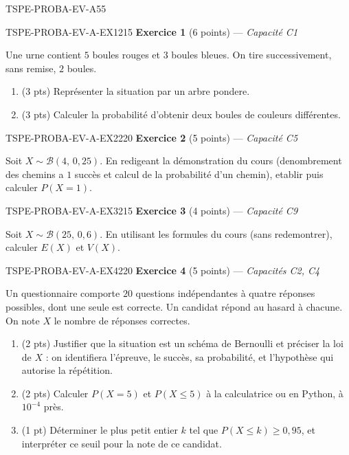 \begin{evaluation}{TSPE-PROBA-EV-A}{55}

\begin{exercice}{TSPE-PROBA-EV-A-EX1}{2}{15}
\textbf{Exercice 1} (6 points) — \textit{Capacité C1}

\medskip

Une urne contient $5$ boules rouges et $3$ boules bleues. On tire successivement, sans remise, $2$ boules.
\begin{enumerate}
  \item (3 pts) Représenter la situation par un arbre pondere.
  \item (3 pts) Calculer la probabilité d'obtenir deux boules de couleurs différentes.
\end{enumerate}
\end{exercice}

\begin{exercice}{TSPE-PROBA-EV-A-EX2}{2}{20}
\textbf{Exercice 2} (5 points) — \textit{Capacité C5}

\medskip

Soit $X \sim \mathcal{B}(4,\,0{,}25)$. En redigeant la démonstration du cours (denombrement des chemins a $1$ succès et calcul de la probabilité d'un chemin), etablir puis calculer $P(X=1)$.
\end{exercice}

\begin{exercice}{TSPE-PROBA-EV-A-EX3}{2}{15}
\textbf{Exercice 3} (4 points) — \textit{Capacité C9}

\medskip

Soit $X \sim \mathcal{B}(25,\,0{,}6)$. En utilisant les formules du cours (sans redemontrer), calculer $E(X)$ et $V(X)$.
\end{exercice}

\begin{exercice}{TSPE-PROBA-EV-A-EX4}{2}{20}
\textbf{Exercice 4} (5 points) — \textit{Capacités C2, C4}

\medskip

Un questionnaire comporte $20$ questions indépendantes à quatre réponses possibles, dont une seule est correcte. Un candidat répond au hasard à chacune. On note $X$ le nombre de réponses correctes.
\begin{enumerate}
  \item (2 pts) Justifier que la situation est un schéma de Bernoulli et préciser la loi de $X$ : on identifiera l'épreuve, le succès, sa probabilité, et l'hypothèse qui autorise la répétition.
  \item (2 pts) Calculer $P(X=5)$ et $P(X\leq5)$ à la calculatrice ou en Python, à $10^{-4}$ près.
  \item (1 pt) Déterminer le plus petit entier $k$ tel que $P(X\leq k)\geq0{,}95$, et interpréter ce seuil pour la note de ce candidat.
\end{enumerate}
\end{exercice}

\end{evaluation}
